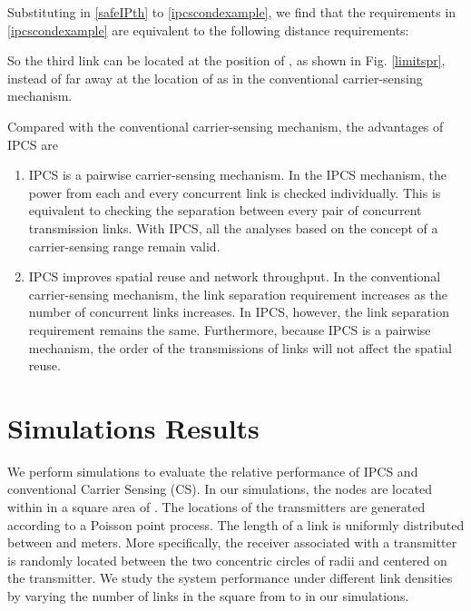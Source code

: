\documentclass[conference]{IEEEtran}
\begin{document}
Substituting  in \eqref{safeIPth} to
\eqref{ipcscondexample}, we f\/ind that the requirements in
\eqref{ipcscondexample} are equivalent to the following distance
requirements:

So the third link can be located at the position of , as shown
in Fig. \ref{limitspr}, instead of far away at the location of 
as in the conventional carrier-sensing mechanism.


Compared with the conventional carrier-sensing mechanism, the
advantages of IPCS are
\begin{enumerate}
\item{IPCS is a pairwise carrier-sensing mechanism.
In the IPCS mechanism, the power from each and every concurrent link
is checked individually. This is equivalent to checking the
separation between every pair of concurrent transmission links. With
IPCS, all the analyses based on the concept of a carrier-sensing
range remain valid.}
\item{IPCS improves spatial reuse and network
throughput. In the conventional carrier-sensing mechanism, the link
separation requirement increases as the number of concurrent links
increases. In IPCS, however, the link separation requirement remains
the same. Furthermore, because IPCS is a pairwise mechanism, the
order of the transmissions of links will not affect the spatial
reuse.}
\end{enumerate}



\section{Simulations Results}\label{simulation}







We perform simulations to evaluate the relative performance of IPCS
and conventional Carrier Sensing (CS). In our simulations, the nodes
are located within in a square area of . The
locations of the transmitters are generated according to a Poisson
point process. The length of a link is uniformly distributed between
 and  meters. More specif\/ically, the receiver associated
with a transmitter is randomly located between the two concentric
circles of radii  and  centered on the transmitter. We
study the system performance under different link densities by
varying the number of links in the square from  to  in our
simulations.
\end{document}
